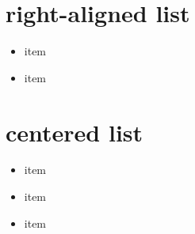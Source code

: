 \chapter{right-aligned list}

\begin{flushright}
\begin{itemize}
\item item
\item item
\end{itemize}
\end{flushright}

\chapter{centered list}

\begin{center}
\begin{itemize}
\item item
\item item
\item item
\end{itemize}
\end{center}
